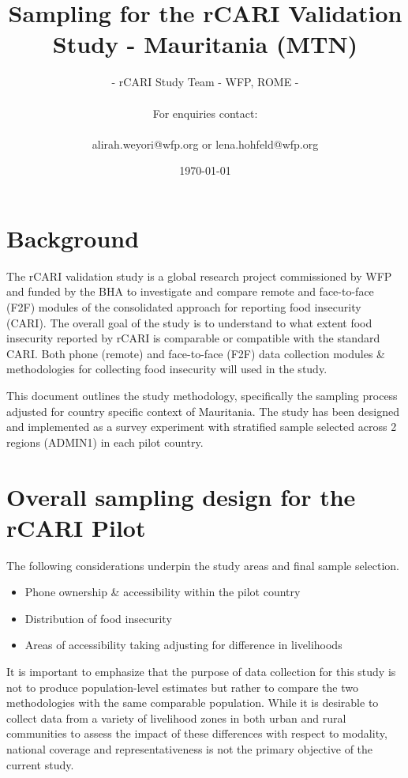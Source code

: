 \documentclass[11pt,harvard]{article}
\title{Sampling for the rCARI Validation Study - Mauritania (MTN)}
\author{- rCARI Study Team - WFP, ROME - 	\\	\\For enquiries contact:\\	\\alirah.weyori@wfp.org or lena.hohfeld@wfp.org}
\date{\today}
\begin{document}
	\maketitle \vspace{-2cm}
	\onehalfspacing
	\pagebreak
	\setlength{\parskip}{8pt} %
	
	\section{Background}
	
	The rCARI validation study is a global research project commissioned by WFP and funded by the BHA to investigate and compare remote and face-to-face (F2F) modules of the consolidated approach for reporting food insecurity (CARI). 
	The overall goal of the study is to understand to what extent food insecurity reported by rCARI is comparable or compatible with the standard CARI. Both phone (remote) and face-to-face (F2F) data collection modules \& methodologies for collecting food insecurity will used in the study.  
	
	This document outlines the study methodology, specifically the sampling process adjusted for country specific context of Mauritania. The study has been designed and implemented as a survey experiment with stratified sample selected across 2 regions (ADMIN1) in each pilot country.  
	
	\section{Overall sampling design for the rCARI Pilot}
	
	The following considerations underpin the study areas and final sample selection.
	
	\begin{itemize}[left=2.0em]
		\item Phone ownership \& accessibility within the pilot country
		\item Distribution of food insecurity
		\item Areas of accessibility taking adjusting for difference in livelihoods
	\end{itemize} 
	
	It is important to emphasize that the purpose of data collection for this study is not to produce population-level estimates but rather to compare the two methodologies with the same comparable population. While it is desirable to collect data from a variety of livelihood zones in both urban and rural communities to assess the impact of these differences with respect to modality, national coverage and representativeness is not the primary objective of the current study. 
	
\end{document}
